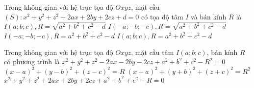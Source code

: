 \begin{ex}%
	Trong không gian với hệ trục tọa độ $Oxyz$, mặt cầu $(S)\colon x^2+y^2+z^2+2ax+2by+2cz+d=0$ có tọa độ tâm $I$ và bán kính $R$ là
	\choice
	{$I(a;b;c), R=\sqrt{a^2+b^2+c^2-d}$}
	{\True $I(-a;-b;-c), R=\sqrt{a^2+b^2+c^2-d}$}
	{$I(-a;-b;-c), R=a^2+b^2+c^2-d$}
	{$I(a;b;c), R=a^2+b^2+c^2-d$}
\end{ex}

\begin{ex}%
	Trong không gian với hệ trục tọa độ $Oxyz$, mặt cầu tâm $I(a;b;c)$, bán kính $R$ có phương trình là
	\choice
	{\True $x^2+y^2+z^2-2ax-2by-2cz+a^2+b^2+c^2-R^2=0$}
	{$(x-a)^2+(y-b)^2+(z-c)^2=R$}
	{$(x+a)^2+(y+b)^2+(z+c)^2=R^2$}
	{$x^2+y^2+z^2+2ax+2by+2cz+a^2+b^2+c^2-R=0$} 
\end{ex}



